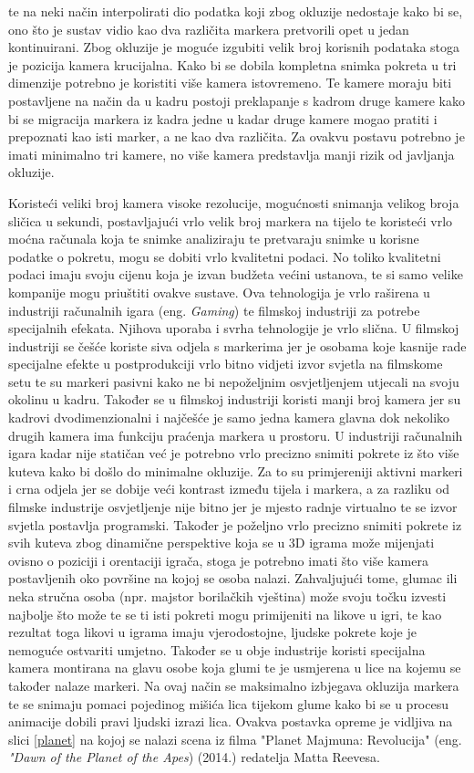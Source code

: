 \documentclass[times, utf8, diplomski]{fer}
\begin{document}
te na neki način interpolirati dio podatka koji zbog okluzije nedostaje kako bi se, ono što je sustav vidio kao dva različita
markera pretvorili opet u jedan kontinuirani. Zbog okluzije je moguće izgubiti velik broj korisnih podataka stoga je pozicija
kamera krucijalna. Kako bi se dobila kompletna snimka
pokreta u tri dimenzije potrebno je koristiti više kamera istovremeno. Te kamere moraju biti postavljene na način da u kadru postoji
preklapanje s kadrom druge kamere kako bi se migracija markera iz kadra jedne u kadar druge kamere mogao pratiti i prepoznati
kao isti marker, a ne kao dva različita. Za ovakvu postavu potrebno je imati minimalno tri kamere, no više kamera predstavlja
manji rizik od javljanja okluzije.

Koristeći veliki broj kamera visoke rezolucije, mogućnosti snimanja velikog broja sličica u sekundi, postavljajući vrlo velik broj 
markera na tijelo te koristeći vrlo moćna računala koja te snimke analiziraju te pretvaraju snimke u korisne podatke o pokretu,
mogu se dobiti vrlo kvalitetni podaci. No toliko kvalitetni podaci imaju svoju cijenu koja je izvan budžeta većini ustanova, te si samo 
velike kompanije mogu priuštiti ovakve sustave. Ova tehnologija je vrlo raširena u industriji računalnih igara
(eng. \textit{Gaming}) te filmskoj industriji za potrebe specijalnih efekata. Njihova uporaba i svrha tehnologije je vrlo slična.
U filmskoj industriji se češće koriste siva odjela s markerima jer je osobama koje kasnije rade specijalne efekte u postprodukciji
vrlo bitno vidjeti izvor svjetla na filmskome setu te su markeri pasivni kako ne bi nepoželjnim osvjetljenjem utjecali na svoju
okolinu u kadru. Također se u filmskoj industriji koristi manji broj kamera jer su kadrovi dvodimenzionalni i najčešće je samo
jedna kamera glavna dok nekoliko drugih kamera ima funkciju praćenja markera u prostoru. U industriji računalnih igara kadar nije
statičan već je potrebno vrlo precizno snimiti pokrete iz što više kuteva kako bi došlo do minimalne okluzije. Za to su primjereniji
aktivni markeri i crna odjela jer se dobije veći kontrast između tijela i markera, a za razliku od filmske industrije
osvjetljenje nije bitno jer je mjesto radnje virtualno te se izvor svjetla postavlja programski. Također je poželjno vrlo precizno
snimiti pokrete iz svih kuteva zbog dinamične perspektive koja se u 3D igrama može mijenjati ovisno o poziciji i orentaciji igrača,
stoga je potrebno imati što više kamera postavljenih oko površine na kojoj se osoba nalazi. Zahvaljujući tome, glumac ili neka stručna 
osoba (npr. majstor borilačkih vještina) može svoju točku izvesti najbolje što može te se ti isti pokreti mogu primijeniti na likove
u igri, te kao rezultat toga likovi u igrama imaju vjerodostojne, ljudske pokrete koje je nemoguće ostvariti umjetno. Također se u
obje industrije koristi specijalna kamera montirana na glavu osobe koja glumi te je usmjerena u lice na kojemu se također nalaze
markeri. Na ovaj način se maksimalno izbjegava okluzija markera te se snimaju pomaci pojedinog mišića lica tijekom glume kako 
bi se u procesu animacije dobili pravi ljudski izrazi lica. Ovakva postavka opreme je vidljiva na slici \ref{planet} na kojoj se
nalazi scena iz filma "Planet Majmuna: Revolucija" (eng. \textit{"Dawn of the Planet of the Apes}) (2014.) redatelja Matta Reevesa.
\end{document}
